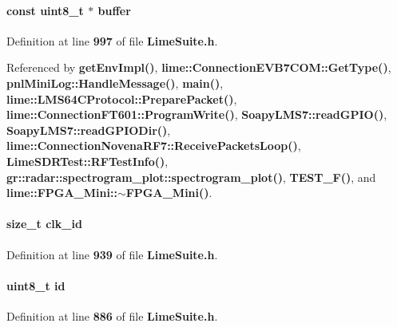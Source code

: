 \paragraph[{buffer}]{\setlength{\rightskip}{0pt plus 5cm}const uint8\+\_\+t $\ast$ buffer}\label{group__FN__LOW__LVL_ga9e71a98856288ad285d7472959bc387e}


Definition at line {\bf 997} of file {\bf Lime\+Suite.\+h}.



Referenced by {\bf get\+Env\+Impl()}, {\bf lime\+::\+Connection\+E\+V\+B7\+C\+O\+M\+::\+Get\+Type()}, {\bf pnl\+Mini\+Log\+::\+Handle\+Message()}, {\bf main()}, {\bf lime\+::\+L\+M\+S64\+C\+Protocol\+::\+Prepare\+Packet()}, {\bf lime\+::\+Connection\+F\+T601\+::\+Program\+Write()}, {\bf Soapy\+L\+M\+S7\+::read\+G\+P\+I\+O()}, {\bf Soapy\+L\+M\+S7\+::read\+G\+P\+I\+O\+Dir()}, {\bf lime\+::\+Connection\+Novena\+R\+F7\+::\+Receive\+Packets\+Loop()}, {\bf Lime\+S\+D\+R\+Test\+::\+R\+F\+Test\+Info()}, {\bf gr\+::radar\+::spectrogram\+\_\+plot\+::spectrogram\+\_\+plot()}, {\bf T\+E\+S\+T\+\_\+\+F()}, and {\bf lime\+::\+F\+P\+G\+A\+\_\+\+Mini\+::$\sim$\+F\+P\+G\+A\+\_\+\+Mini()}.

\paragraph[{clk\+\_\+id}]{\setlength{\rightskip}{0pt plus 5cm}size\+\_\+t clk\+\_\+id}\label{group__FN__LOW__LVL_ga41e94e558bfa441466772aae351e05c4}


Definition at line {\bf 939} of file {\bf Lime\+Suite.\+h}.

\paragraph[{id}]{\setlength{\rightskip}{0pt plus 5cm}uint8\+\_\+t id}\label{group__FN__LOW__LVL_ga1e6927fa1486224044e568f9c370519b}


Definition at line {\bf 886} of file {\bf Lime\+Suite.\+h}.



